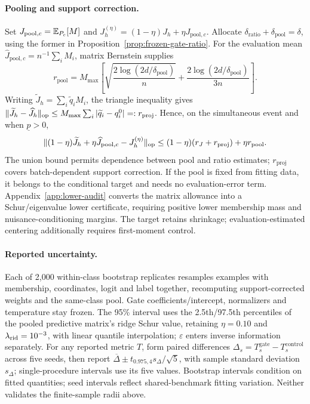 \paragraph{Pooling and support correction.}
Set $J_{\mathrm{pool},c}=\mathbb{E}_{P_c}[M]$ and $J_h^{(\eta)}=(1-\eta)J_h+\eta J_{\mathrm{pool},c}$. Allocate $\delta_{\mathrm{ratio}}+\delta_{\mathrm{pool}}=\delta$, using the former in Proposition~\ref{prop:frozen-gate-ratio}. For the evaluation mean $\widehat J_{\mathrm{pool},c}=n^{-1}\sum_iM_i$, matrix Bernstein supplies
\[
r_{\mathrm{pool}}=M_{\max}\left[\sqrt{\frac{2\log(2d/\delta_{\mathrm{pool}})}n}
+\frac{2\log(2d/\delta_{\mathrm{pool}})}{3n}\right].
\]
Writing $\widetilde J_h=\sum_i\widetilde q_iM_i$, the triangle inequality gives
$\lVert\widetilde J_h-\widehat J_h\rVert_{\mathrm{op}}\le M_{\max}\sum_i|\widetilde q_i-q_i^0|=:r_{\mathrm{proj}}$.
Hence, on the simultaneous event and when $\underline p>0$,
\begin{equation}
\lVert(1-\eta)\widetilde J_h+\eta\widehat J_{\mathrm{pool},c}-J_h^{(\eta)}\rVert_{\mathrm{op}}
\le(1-\eta)(r_J+r_{\mathrm{proj}})+\eta r_{\mathrm{pool}}.
\label{eq:gate-projection-allowance}
\end{equation}
The union bound permits dependence between pool and ratio estimates; $r_{\mathrm{proj}}$ covers batch-dependent support correction. If the pool is fixed from fitting data, it belongs to the conditional target and needs no evaluation-error term. Appendix~\ref{app:lower-audit} converts the matrix allowance into a Schur/eigenvalue lower certificate, requiring positive lower membership mass and nuisance-conditioning margins. The target retains shrinkage; evaluation-estimated centering additionally requires first-moment control.

\paragraph{Reported uncertainty.}
Each of 2,000 within-class bootstrap replicates resamples examples with membership, coordinates, logit and label together, recomputing support-corrected weights and the same-class pool. Gate coefficients/intercept, normalizers and temperature stay frozen. The 95\% interval uses the 2.5th/97.5th percentiles of the pooled predictive matrix's ridge Schur value, retaining $\eta=0.10$ and $\lambda_{\mathrm{rid}}=10^{-3}$, with linear quantile interpolation; $\varepsilon$ enters inverse information separately. For any reported metric $T$, form paired differences $\Delta_s=T_s^{\mathrm{gate}}-T_s^{\mathrm{control}}$ across five seeds, then report $\overline\Delta\pm t_{0.975,4}s_\Delta/\sqrt5$, with sample standard deviation $s_\Delta$; single-procedure intervals use its five values. Bootstrap intervals condition on fitted quantities; seed intervals reflect shared-benchmark fitting variation. Neither validates the finite-sample radii above.

